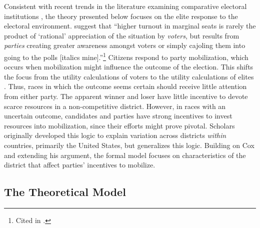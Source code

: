 \documentclass[12pt]{article}
\begin{document}
Consistent with recent trends in the literature examining comparative electoral institutions \citep{Cox1999, Selb2009}, the theory presented below focuses on the elite response to the electoral environment. \cite{DenverHands1974} suggest that ``higher turnout in marginal seats is rarely the product of `rational' appreciation of the situation by \textit{voters}, but results from \textit{parties} creating greater awareness amongst voters or simply cajoling them into going to the polls [italics mine].''\footnote{Cited in \cite{Cox1999}.} Citizens respond to party mobilization, which occurs when mobilization might influence the outcome of the election. This shifts the focus from the utility calculations of voters to the utility calculations of elites \citep{CoxMunger1989, Cox1999}. Thus, races in which the outcome seems certain should receive little attention from either party. The apparent winner and loser have little incentive to devote scarce resources in a non-competitive district. However, in races with an uncertain outcome, candidates and parties have strong incentives to invest resources into mobilization, since their efforts might prove pivotal. Scholars originally developed this logic to explain variation across districts \textit{within} countries, primarily the United States, but \cite{Cox1999} generalizes this logic. Building on Cox and extending his argument, the formal model focuses on characteristics of the district that affect parties' incentives to mobilize.

\subsection*{The Theoretical Model}
\end{document}
